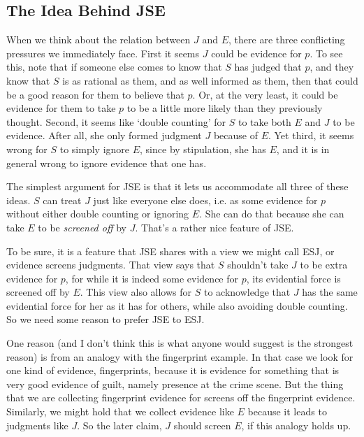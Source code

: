 \subsection{The Idea Behind JSE}

When we think about the relation between \(J\) and \(E\), there are three conflicting pressures we immediately face. First it seems \(J\) could be evidence for \(p\). To see this, note that if someone else comes to know that \(S\) has judged that \(p\), and they know that \(S\) is as rational as them, and as well informed as them, then that could be a good reason for them to believe that \(p\). Or, at the very least, it could be evidence for them to take \(p\) to be a little more likely than they previously thought. Second, it seems like `double counting' for \(S\) to take both \(E\) and \(J\) to be evidence. After all, she only formed judgment \(J\) because of \(E\). Yet third, it seems wrong for \(S\) to simply ignore \(E\), since by stipulation, she has \(E\), and it is in general wrong to ignore evidence that one has.

The simplest argument for JSE is that it lets us accommodate all three of these ideas. \(S\) can treat \(J\) just like everyone else does, i.e. as some evidence for \(p\) without either double counting or ignoring \(E\). She can do that because she can take \(E\) to be \textit{screened off} by \(J\). That's a rather nice feature of JSE.

To be sure, it is a feature that JSE shares with a view we might call ESJ, or evidence screens judgments. That view says that \(S\) shouldn't take \(J\) to be extra evidence for \(p\), for while it is indeed some evidence for \(p\), its evidential force is screened off by \(E\). This view also allows for \(S\) to acknowledge that \(J\) has the same evidential force for her as it has for others, while also avoiding double counting. So we need some reason to prefer JSE to ESJ.

One reason (and I don't think this is what anyone would suggest is the strongest reason) is from an analogy with the fingerprint example. In that case we look for one kind of evidence, fingerprints, because it is evidence for something that is very good evidence of guilt, namely presence at the crime scene. But the thing that we are collecting fingerprint evidence for screens off the fingerprint evidence. Similarly, we might hold that we collect evidence like \(E\) because it leads to judgments like \(J\). So the later claim, \(J\) should screen \(E\), if this analogy holds up.

